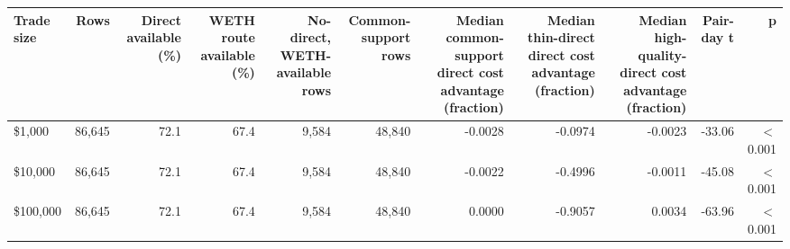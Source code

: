\begin{tabular}{lrrrrrrrrrr}
\toprule
Trade size & Rows & Direct available (\%) & WETH route available (\%) & No-direct, WETH-available rows & Common-support rows & Median common-support direct cost advantage (fraction) & Median thin-direct direct cost advantage (fraction) & Median high-quality-direct cost advantage (fraction) & Pair-day t & p \\
\midrule
\$1,000 & 86,645 & 72.1 & 67.4 & 9,584 & 48,840 & -0.0028 & -0.0974 & -0.0023 & -33.06 & \ensuremath{<}0.001 \\
\$10,000 & 86,645 & 72.1 & 67.4 & 9,584 & 48,840 & -0.0022 & -0.4996 & -0.0011 & -45.08 & \ensuremath{<}0.001 \\
\$100,000 & 86,645 & 72.1 & 67.4 & 9,584 & 48,840 & 0.0000 & -0.9057 & 0.0034 & -63.96 & \ensuremath{<}0.001 \\
\bottomrule
\end{tabular}
